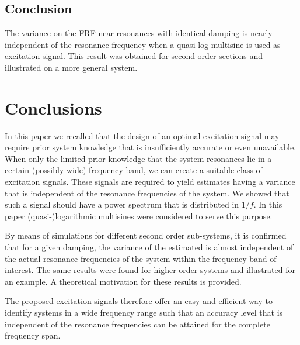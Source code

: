 \subsection{Conclusion}
The variance on the FRF near resonances with identical damping is nearly independent of the resonance frequency when a quasi-log multisine is used as excitation signal. 
This result was obtained for second order sections and illustrated on a more general system.

\section{Conclusions}\label{sec:conclusions}
In this paper we recalled that the design of an optimal excitation signal may require prior system knowledge that is insufficiently accurate or even unavailable. 
When only the limited prior knowledge that the system resonances lie in a certain (possibly wide) frequency band, we can create a suitable class of excitation signals. 
These signals are required to yield estimates having a variance that is independent of the resonance frequencies of the system. 
We showed that such a signal should have a power spectrum that is distributed in $1/f$.
In this paper (quasi-)logarithmic multisines were considered to serve this purpose.

By means of simulations for different second order sub-systems, it is confirmed that for a given damping, the variance of the estimated is almost independent of the actual resonance frequencies of the system within the frequency band of interest.
The same results were found for higher order systems and illustrated for an example. 
A theoretical motivation for these results is provided.

The proposed excitation signals therefore offer an easy and efficient way to identify systems in a wide frequency range such that an accuracy level that is independent of the resonance frequencies can be attained for the complete frequency span.
